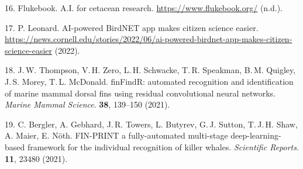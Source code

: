 \documentclass[twocolumn]{article}
\begin{document}
16. Flukebook. A.I. for cetacean research. \url{https://www.flukebook.org/} (n.d.).

17. P. Leonard. AI-powered BirdNET app makes citizen science easier. \url{https://news.cornell.edu/stories/2022/06/ai-powered-birdnet-app-makes-citizen-science-easier} (2022).

18. J.\,W. Thompson, V.\,H. Zero, L.\,H. Schwacke, T.\,R. Speakman, B.\,M. Quigley, J.\,S. Morey, T.\,L. McDonald. finFindR: automated recognition and identification of marine mammal dorsal fins using residual convolutional neural networks. \textit{Marine Mammal Science}. \textbf{38}, 139–150 (2021).

19. C. Bergler, A. Gebhard, J.\,R. Towers, L. Butyrev, G.\,J. Sutton, T.\,J.\,H. Shaw, A. Maier, E. Nöth. FIN-PRINT a fully-automated multi-stage deep-learning-based framework for the individual recognition of killer whales. \textit{Scientific Reports}. \textbf{11}, 23480 (2021).
\end{document}
